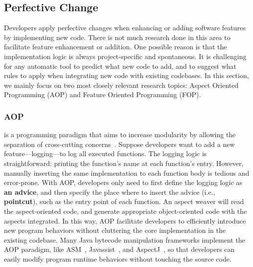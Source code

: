 \documentclass[runningheads,a4paper]{llncs}
\begin{document}

\subsection{Perfective Change}
\label{sec:perfective}
Developers apply perfective changes when enhancing or adding software features by implementing new code. There is not much research done in this area to facilitate feature enhancement or addition. One possible reason is that the implementation logic is always project-specific and spontaneous. It is challenging for any automatic tool to predict what new code to add, and to suggest what rules to apply when integrating new code with existing codebases. In this section, we mainly focus on two most closely relevant research topics: Aspect Oriented Programming (AOP) and Feature Oriented Programming (FOP).


\subsubsection{AOP} is a programming paradigm that aims to increase modularity by allowing the separation of cross-cutting concerns~\cite{Kiczales1997}. Suppose developers want to add a new feature---logging---to log all executed functions. 
The logging logic is straightforward: printing the function's name at each function's entry. However, manually inserting the same implementation to each function body is tedious and error-prone. With AOP, developers only need to first define the logging logic as \textbf{an advice}, and then specify the place where to insert the advice (i.e., \textbf{pointcut}), such as the entry point of each function. An aspect weaver will read the aspect-oriented code, and generate appropriate object-oriented code with the aspects integrated. In this way, AOP facilitate developers to efficiently introduce new program behaviors without cluttering the core implementation in the existing codebase. Many Java bytecode manipulation frameworks implement the AOP paradigm, like ASM~\cite{asm}, Javassist~\cite{javassist}, and AspectJ~\cite{aspectj}, so that developers can easily modify program runtime behaviors without touching the source code. 
\end{document}
